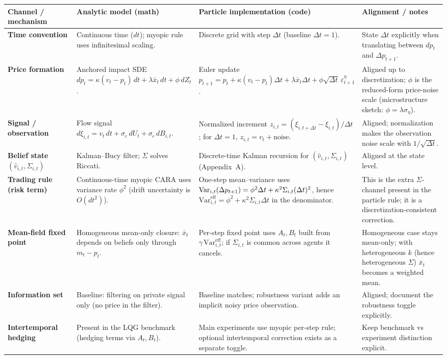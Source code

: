 \begin{tabular}{p{0.18\linewidth} p{0.27\linewidth} p{0.30\linewidth} p{0.25\linewidth}}
\toprule
\textbf{Channel / mechanism} & \textbf{Analytic model (math)} & \textbf{Particle implementation (code)} & \textbf{Alignment / notes} \\
\midrule
\textbf{Time convention} &
Continuous time ($dt$); myopic rule uses infinitesimal scaling. &
Discrete grid with step $\Delta t$ (baseline $\Delta t=1$). &
State $\Delta t$ explicitly when translating between $dp_t$ and $\Delta p_{t+1}$. \\
\addlinespace
\textbf{Price formation} &
Anchored impact SDE $dp_t=\kappa(v_t-p_t)\,dt+\lambda\bar x_t\,dt+\phi\,dZ_t$. &
Euler update $p_{t+1}=p_t+\kappa(v_t-p_t)\Delta t+\lambda\bar x_t\Delta t+\phi\sqrt{\Delta t}\,\varepsilon^\eta_{t+1}$. &
Aligned up to discretization; $\phi$ is the reduced-form price-noise scale (microstructure sketch: $\phi=\lambda\sigma_\eta$). \\
\addlinespace
\textbf{Signal / observation} &
Flow signal $d\xi_{i,t}=v_t\,dt+\sigma_c\,dU_t+\sigma_\epsilon\,dB_{i,t}$. &
Normalized increment $z_{i,t}=(\xi_{i,t+\Delta t}-\xi_{i,t})/\Delta t$; for $\Delta t=1$, $z_{i,t}=v_t+\text{noise}$. &
Aligned; normalization makes the observation noise scale with $1/\sqrt{\Delta t}$. \\
\addlinespace
\textbf{Belief state} $(\hat v_{i,t},\Sigma_{i,t})$ &
Kalman--Bucy filter; $\Sigma$ solves Riccati. &
Discrete-time Kalman recursion for $(\hat v_{i,t},\Sigma_{i,t})$ (Appendix~A). &
Aligned at the state level. \\
\addlinespace
\textbf{Trading rule (risk term)} &
Continuous-time myopic CARA uses variance rate $\phi^2$ (drift uncertainty is $O(dt^2)$). &
One-step mean--variance uses $\text{Var}_{i,t}(\Delta p_{t+1})=\phi^2\Delta t+\kappa^2\Sigma_{i,t}(\Delta t)^2$, hence $\mathrm{Var}^{\mathrm{eff}}_{i,t}=\phi^2+\kappa^2\Sigma_{i,t}\Delta t$ in the denominator. &
This is the extra $\Sigma$-channel present in the particle rule; it is a discretization-consistent correction. \\
\addlinespace
\textbf{Mean-field fixed point} &
Homogeneous mean-only closure: $\bar x_t$ depends on beliefs only through $m_t-p_t$. &
Per-step fixed point uses $A_t,B_t$ built from $\gamma\,\mathrm{Var}^{\mathrm{eff}}_{i,t}$; if $\Sigma_{i,t}$ is common across agents it cancels. &
Homogeneous case stays mean-only; with heterogeneous $k$ (hence heterogeneous $\Sigma$) $\bar x_t$ becomes a weighted mean. \\
\addlinespace
\textbf{Information set} &
Baseline: filtering on private signal only (no price in the filter). &
Baseline matches; robustness variant adds an implicit noisy price observation. &
Aligned; document the robustness toggle explicitly. \\
\addlinespace
\textbf{Intertemporal hedging} &
Present in the LQG benchmark (hedging terms via $A_t,B_t$). &
Main experiments use myopic per-step rule; optional intertemporal correction exists as a separate toggle. &
Keep benchmark vs experiment distinction explicit. \\
\bottomrule
\end{tabular}
